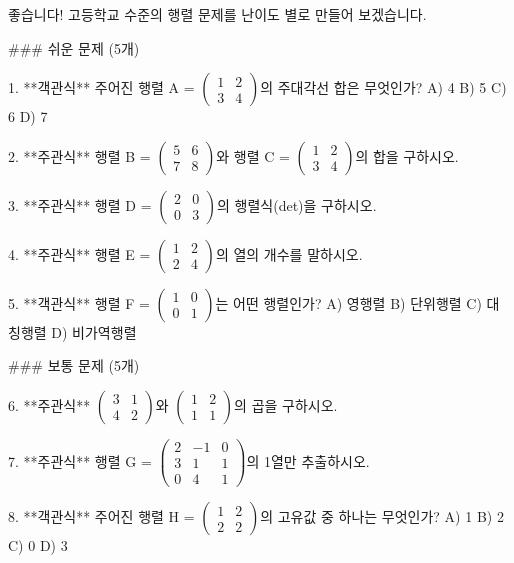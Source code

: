 좋습니다! 고등학교 수준의 행렬 문제를 난이도 별로 만들어 보겠습니다.

### 쉬운 문제 (5개)

1. **객관식**  
   주어진 행렬 A = \(\begin{pmatrix} 1 & 2 \\ 3 & 4 \end{pmatrix}\)의 주대각선 합은 무엇인가?  
   A) 4  
   B) 5  
   C) 6  
   D) 7  

2. **주관식**  
   행렬 B = \(\begin{pmatrix} 5 & 6 \\ 7 & 8 \end{pmatrix}\)와 행렬 C = \(\begin{pmatrix} 1 & 2 \\ 3 & 4 \end{pmatrix}\)의 합을 구하시오.  

3. **주관식**  
   행렬 D = \(\begin{pmatrix} 2 & 0 \\ 0 & 3 \end{pmatrix}\)의 행렬식(det)을 구하시오.  

4. **주관식**  
   행렬 E = \(\begin{pmatrix} 1 & 2 \\ 2 & 4 \end{pmatrix}\)의 열의 개수를 말하시오.  

5. **객관식**  
   행렬 F = \(\begin{pmatrix} 1 & 0 \\ 0 & 1 \end{pmatrix}\)는 어떤 행렬인가?  
   A) 영행렬  
   B) 단위행렬  
   C) 대칭행렬  
   D) 비가역행렬  

### 보통 문제 (5개)

6. **주관식**  
   \(\begin{pmatrix} 3 & 1 \\ 4 & 2 \end{pmatrix}\)와 \(\begin{pmatrix} 1 & 2 \\ 1 & 1 \end{pmatrix}\)의 곱을 구하시오.  

7. **주관식**  
   행렬 G = \(\begin{pmatrix} 2 & -1 & 0 \\ 3 & 1 & 1 \\ 0 & 4 & 1 \end{pmatrix}\)의 1열만 추출하시오.  

8. **객관식**  
   주어진 행렬 H = \(\begin{pmatrix} 1 & 2 \\ 2 & 2 \end{pmatrix}\)의 고유값 중 하나는 무엇인가?  
   A) 1  
   B) 2  
   C) 0  
   D) 3  

